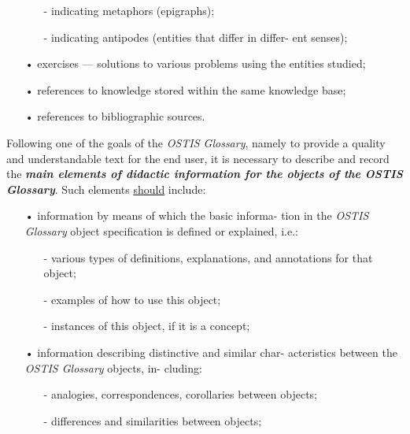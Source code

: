 \documentclass{article}
\begin{document}
\begin{multicols}{2}

\begin{itemize}
\begin{itemize}

\item[-]indicating metaphors (epigraphs);
\item[-]indicating antipodes (entities that differ in differ-
ent senses);
\end{itemize}
\item[•]exercises — solutions to various problems using the
entities studied;
\item[•]references to knowledge stored within the same
knowledge base;
\item[•]references to bibliographic sources.

\end{itemize}

\quad
Following one of the goals of the \textit{OSTIS Glossary},
namely to provide a quality and understandable text for
the end user, it is necessary to describe and record the
\textbf{\textit{main elements of didactic information for the objects
of the OSTIS Glossary}}. Such elements \underline{should} include:

\begin{itemize}

\item[•]information by means of which the basic informa-
tion in the \textit{OSTIS Glossary} object specification is
defined or explained, i.e.:
\begin{itemize}
\item[-]various types of definitions, explanations, and
annotations for that object;
\item[-]examples of how to use this object;
\item[-]instances of this object, if it is a concept;
\end{itemize}
\item[•]information describing distinctive and similar char-
acteristics between the \textit{OSTIS Glossary} objects, in-
cluding:
\begin{itemize}
\item[-]analogies, correspondences, corollaries between
objects;
\item[-]differences and similarities between objects;

\end{itemize}
\end{itemize}


\end{multicols}
\end{document}
